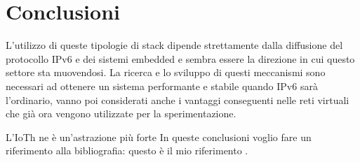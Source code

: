 
\chapter*{Conclusioni}
L'utilizzo di queste tipologie di stack dipende strettamente dalla diffusione del protocollo IPv6 e dei sistemi embedded e sembra essere la direzione in cui questo settore sta muovendosi.
La ricerca e lo sviluppo di questi meccanismi sono necessari ad ottenere un sistema performante e stabile quando IPv6 sar\`a l'ordinario, vanno poi considerati anche i vantaggi conseguenti nelle reti virtuali che gi\`a ora vengono utilizzate per la sperimentazione.

L'IoTh ne \`e un'astrazione pi\`u forte
In queste conclusioni voglio fare un riferimento alla
bibliografia: questo \`e il mio riferimento \cite{K3,K4}.

